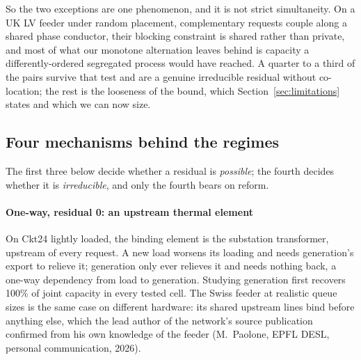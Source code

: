 \documentclass[review,authoryear,12pt]{elsarticle}
\begin{document}
So the two exceptions are one phenomenon, and it is not strict simultaneity.
On a UK LV feeder under random placement, complementary requests couple along a
shared phase conductor, their blocking constraint is shared rather than
private, and most of what our monotone alternation leaves behind is capacity a
differently-ordered segregated process would have reached. A quarter to a third
of the pairs survive that test and are a genuine irreducible residual without
co-location; the rest is the looseness of the bound, which
Section~\ref{sec:limitations} states and which we can now size.

\subsection{Four mechanisms behind the regimes}
\label{sec:mechanism}

The first three below decide whether a residual is \emph{possible}; the fourth
decides whether it is \emph{irreducible}, and only the fourth bears on reform.

\paragraph{One-way, residual 0: an upstream thermal element}
On Ckt24 lightly loaded, the binding element is the substation transformer,
upstream of every request. A new load worsens its loading and needs
generation's export to relieve it; generation only ever relieves it and
needs nothing back, a one-way dependency from load to generation. Studying
generation first recovers 100\% of joint capacity in every tested cell. The
Swiss feeder at realistic queue sizes is the same case on different
hardware: its shared upstream lines bind before anything else, which the
lead author of the network's source publication confirmed from his own
knowledge of the feeder (M.\ Paolone, EPFL DESL, personal communication,
2026).
\end{document}
